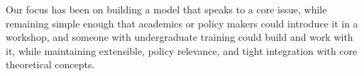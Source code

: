 


Our focus has been on building a model that speaks to a core issue, while remaining simple enough that %
academics or policy makers could introduce it in a workshop, and someone with undergraduate training could build and work with it, while maintaining extensible, policy relevance, and tight integration with core theoretical concepts. %

